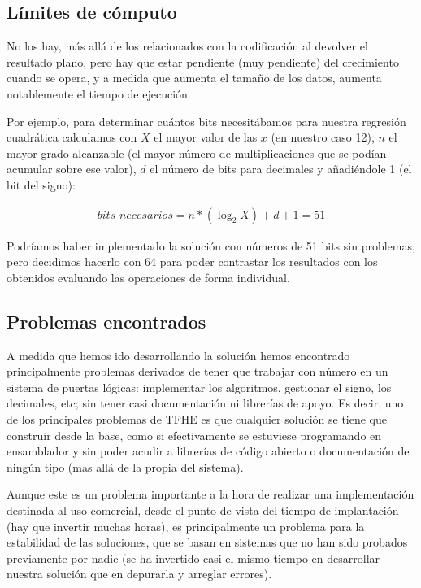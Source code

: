 \subsection{Límites de cómputo}

No los hay, más allá de los relacionados con la codificación al devolver el resultado plano, pero hay que estar pendiente (muy pendiente) del crecimiento cuando se opera, y a medida que aumenta el tamaño de los datos, aumenta notablemente el tiempo de ejecución.

Por ejemplo, para determinar cuántos bits necesitábamos para nuestra regresión cuadrática calculamos con $X$ el mayor valor de las $x$ (en nuestro caso 12), $n$ el mayor grado alcanzable (el mayor número de multiplicaciones que se podían acumular sobre ese valor), $d$ el número de bits para decimales y añadiéndole 1 (el bit del signo):

\begin{gather}
bits\_necesarios = n * (\log_2{X}) + d + 1 = 51
\end{gather}

Podríamos haber implementado la solución con números de 51 bits sin problemas, pero decidimos hacerlo con 64 para poder contrastar los resultados con los obtenidos evaluando las operaciones de forma individual.

\subsection{Problemas encontrados}

A medida que hemos ido desarrollando la solución hemos encontrado principalmente problemas derivados de tener que trabajar con número en un sistema de puertas lógicas: implementar los algoritmos, gestionar el signo, los decimales, etc; sin tener casi documentación ni librerías de apoyo. Es decir, uno de los principales problemas de TFHE es que cualquier solución se tiene que construir desde la base, como si efectivamente se estuviese programando en ensamblador y sin poder acudir a librerías de código abierto o documentación de ningún tipo (mas allá de la propia del sistema).

Aunque este es un problema importante a la hora de realizar una implementación destinada al uso comercial, desde el punto de vista del tiempo de implantación (hay que invertir muchas horas), es principalmente un problema para la estabilidad de las soluciones, que se basan en sistemas que no han sido probados previamente por nadie (se ha invertido casi el mismo tiempo en desarrollar nuestra solución que en depurarla y arreglar errores).

